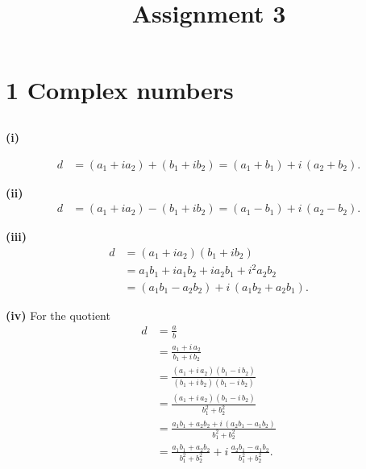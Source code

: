 \documentclass[12pt]{article}
\title{Assignment 3}
\begin{document}
\maketitle


\section{1 Complex numbers}

\subsection{} %

\textbf{(i)} 

\begin{equation}
\begin{aligned}
d &=(a_1 + i a_2) + (b_1 + i b_2) = (a_1 + b_1) + i\,(a_2 + b_2).
\end{aligned}
\end{equation}

\textbf{(ii)}
\begin{equation}
\begin{aligned}
d &=(a_1 + i a_2) - (b_1 + i b_2) = (a_1 - b_1) + i\,(a_2 - b_2).
\end{aligned}
\end{equation}

\textbf{(iii)} 
\begin{equation}
\begin{aligned}
d &=(a_1 + i a_2)(b_1 + i b_2) \\
&= a_1b_1 + i a_1b_2 + i a_2b_1 + i^2 a_2b_2\\
&= (a_1b_1 - a_2b_2) + i\,(a_1b_2 + a_2b_1).
\end{aligned}
\end{equation}

\textbf{(iv)} For the quotient 
\begin{equation}
\begin{aligned}
d &= \frac{a}{b} \\
&= \frac{a_1 + i\,a_2}{b_1 + i\,b_2}\\
&= \frac{(a_1 + i\,a_2)(b_1 - i\,b_2)}{(b_1 + i\,b_2)(b_1 - i\,b_2)}\\
&= \frac{(a_1 + i\,a_2)(b_1 - i\,b_2)}{b_1^2 + b_2^2} \\
&= \frac{a_1b_1 + a_2b_2 + i\,(a_2b_1 - a_1b_2)}{b_1^2 + b_2^2}\\
&= \frac{a_1b_1 + a_2b_2}{b_1^2+b_2^2} + i\,\frac{a_2b_1 - a_1b_2}{b_1^2+b_2^2}.
\end{aligned}
\end{equation}
\end{document}
